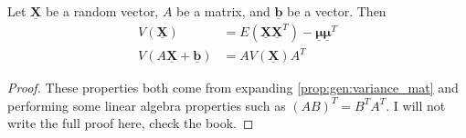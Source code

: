 \documentclass[12pt]{extarticle}
\renewcommand{\vec}[1]{\underline{\mathbf{#1}}}
\begin{document}
\begin{theorem}
    Let $\vec X$ be a random vector, $A$ be a matrix, and $\vec b$ be a vector.
    Then
    \begin{align}
        V(\vec X)            & = E(\vec X \vec X^T) - \vec \mu \vec \mu^T \\
        V(A \vec X + \vec b) & = A V(\vec X) A^T
    \end{align}
\end{theorem}

\begin{proof}
    These properties both come from expanding \autoref{prop:gen:variance_mat} and performing some linear algebra properties such as $(AB)^T = B^T A^T$.
    I will not write the full proof here, check the book.
\end{proof}
\end{document}
